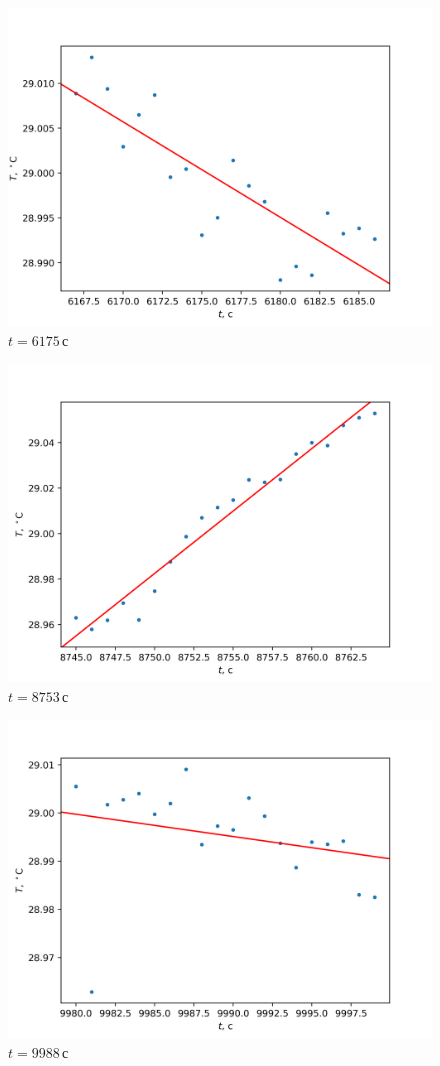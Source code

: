 \documentclass[a4paper, 12pt]{article}
\begin{document}
    \begin{figure}[ht!]
        \centering\includegraphics[width=0.6\linewidth]{img/6175.png}
        \caption{$t=6175\,\text{с}$}
    \end{figure}
    \begin{figure}[ht!]
        \centering\includegraphics[width=0.6\linewidth]{img/8753.png}
        \caption{$t=8753\,\text{с}$}
    \end{figure}
    \begin{figure}[ht!]
        \centering\includegraphics[width=0.6\linewidth]{img/9988.png}
        \caption{$t=9988\,\text{с}$}
    \end{figure}
\end{document}
